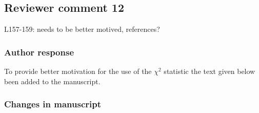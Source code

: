 


\subsection*{Reviewer comment 12}
L157-159: needs to be better motived, references?

\subsubsection*{Author response}

To provide  better motivation for the use of the $\chi^2$ statistic
the text given below been added to the manuscript.

\subsubsection{Changes in manuscript}

